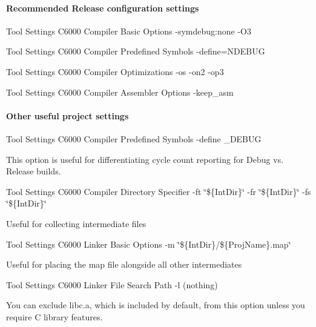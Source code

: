 \hypertarget{a00832_subsubsection__recommended_release_configuration_settings_}{}\paragraph{Recommended Release configuration settings}\label{a00832_subsubsection__recommended_release_configuration_settings_}
  Tool Settings   C6000 Compiler   Basic Options   {\ttfamily -\/symdebug\+:none}  {\ttfamily -\/O3}

 Tool Settings   C6000 Compiler   Predefined Symbols   {\ttfamily -\/define=N\+D\+E\+B\+UG}

 Tool Settings   C6000 Compiler   Optimizations   {\ttfamily -\/os}  {\ttfamily -\/on2}  {\ttfamily -\/op3}

 Tool Settings   C6000 Compiler   Assembler Options   {\ttfamily -\/keep\+\_\+asm} 

\hypertarget{a00832_subsubsection__other_useful_project_settings_}{}\paragraph{Other useful project settings}\label{a00832_subsubsection__other_useful_project_settings_}
  Tool Settings   C6000 Compiler   Predefined Symbols   {\ttfamily -\/define \+\_\+\+D\+E\+B\+UG}

This option is useful for differentiating cycle count reporting for Debug vs. Release builds.

 Tool Settings   C6000 Compiler   Directory Specifier   {\ttfamily -\/ft \char`\"{}\$\{\+Int\+Dir\}\char`\"{}}  {\ttfamily -\/fr \char`\"{}\$\{\+Int\+Dir\}\char`\"{}}  {\ttfamily -\/fs \char`\"{}\$\{\+Int\+Dir\}\char`\"{}}

Useful for collecting intermediate files

 Tool Settings   C6000 Linker   Basic Options   {\ttfamily -\/m \char`\"{}\$\{\+Int\+Dir\}/\$\{\+Proj\+Name\}.\+map\char`\"{}}

Useful for placing the map file alongside all other intermediates

 Tool Settings   C6000 Linker   File Search Path   {\ttfamily -\/l (nothing)}

You can exclude libc.\+a, which is included by default, from this option unless you require C library features.


